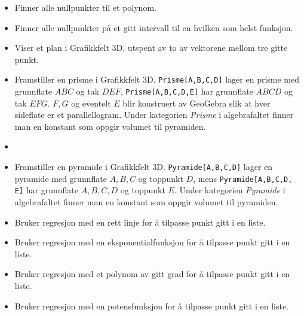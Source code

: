 \begin{itemize}
\item {}
{Finner alle nullpunkter til et polynom.}

\item {}
{Finner alle nullpunkter på et gitt intervall til en hvilken som helst funksjon.}

\item {}
{Viser et plan i Grafikkfelt 3D, utspent av to av vektorene mellom tre gitte punkt.}

\item {}
{Framstiller en prisme i Grafikkfelt 3D. {\tt Prisme[A,B,C,D]} lager en prisme med grunnflate $ ABC $ og tak $ DEF $, {\tt Prisme[A,B,C,D,E]} har grunnflate $ ABCD $ og tak $ EFG $. $ F, G$ og eventelt $ E $ blir konstruert av GeoGebra slik at hver sideflate er et parallellogram. Under kategorien \textsl{Prisme} i algebrafaltet finner man en konstant som oppgir volumet til pyramiden.}

\item {}

\item {}
{Framstiller en pyramide i Grafikkfelt 3D. {\tt Pyramide[A,B,C,D]} lager en pyramide med grunnflate ${ A, B, C} $ og toppunkt $ D $, mens {\tt Pyramide[A,B,C,D, E]} har grunnflate ${ A, B, C, D }$ og toppunkt $ E $. Under kategorien \textsl{Pyramide} i algebrafaltet finner man en konstant som oppgir volumet til pyramiden.}

\item {}
{Bruker regresjon med en rett linje for å tilpasse punkt gitt i en liste.}

\item {}
{Bruker regresjon med en eksponentialfunksjon for å tilpasse punkt gitt i en liste.}

\item {}
{Bruker regresjon med et polynom av gitt grad for å tilpasse punkt gitt i en liste.}

\item {}
{Bruker regresjon med en potensfunksjon for å tilpasse punkt gitt i en liste.}


\end{itemize}
